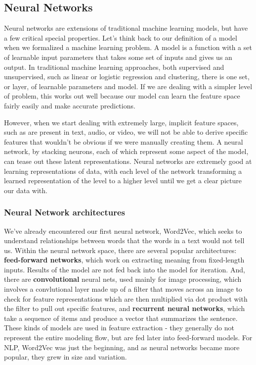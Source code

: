 \documentclass[11pt, table]{diazessay} %
\begin{document}
\begin{sloppypar}
\subsection{Neural Networks}

Neural networks are extensions of traditional machine learning models, but have a few critical special properties. Let's think back to our definition of a model when we formalized a machine learning problem. A model is a function with a set of learnable input parameters that takes some set of inputs and gives us an output. In traditional machine learning approaches, both supervised and unsupervised, such as linear or logistic regression and clustering, there is one set, or layer, of learnable parameters and model. If we are dealing with a simpler level of problem, this works out well because our model can learn the feature space fairly easily and make accurate predictions. 

However, when we start dealing with extremely large, implicit feature spaces, such as are present in text, audio, or video, we will not be able to derive specific features that wouldn't be obvious if we were manually creating them. A neural network, by stacking neurons, each of which represent some aspect of the model, can tease out these latent representations. Neural networks are extremely good at learning representations of data, with each level of the network transforming a learned representation of the level to a higher level until we get a clear picture our data with\citep{lecun2015deep}. 

\subsubsection{Neural Network architectures}

We've already encountered our first neural network, Word2Vec, which seeks to understand relationships between words that the words in a text would not tell us. Within the neural network space, there are several popular architectures: \textbf{feed-forward networks}, which work on extracting meaning from fixed-length inputs. Results of the model are not fed back into the model for iteration. And, there are   \textbf{convolutional} neural nets, used mainly for image processing, which involves a convlutional layer made up of a filter that moves across an image to check for feature representations which are then multiplied via dot product with the filter to pull out specific features, and \textbf{recurrent neural networks}, which take a sequence of items and produce a vector that summarizes the sentence. These kinds of models are used in feature extraction - they generally do not represent the entire modeling flow, but are fed later into feed-forward models. For NLP, Word2Vec was just the beginning, and as neural networks became more popular, they grew in size and variation.


\end{sloppypar}
\end{document}
